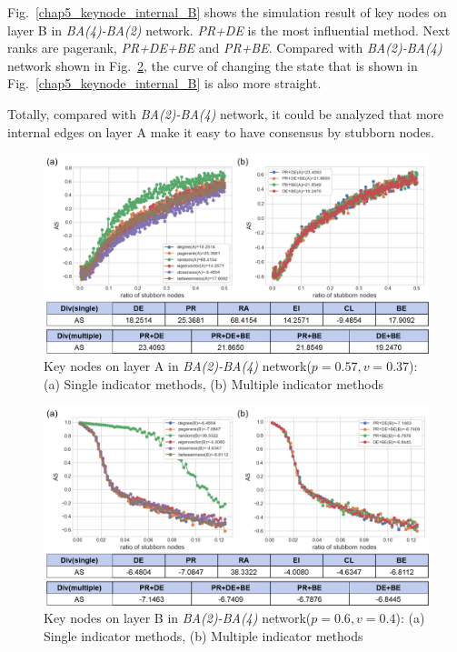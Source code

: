 Fig.~\ref{chap5_keynode_internal_B} shows the simulation result of key nodes on layer B in \textit{BA(4)-BA(2)} network. \textit{PR+DE} is the most influential method. Next ranks are pagerank, \textit{PR+DE+BE} and \textit{PR+BE}. Compared with \textit{BA(2)-BA(4)} network shown in Fig.~\ref{chap5_keynode_internal_B2}, the curve of changing the state that is shown in Fig.~\ref{chap5_keynode_internal_B} is also more straight. 

Totally, compared with \textit{BA(2)-BA(4)} network, it could be analyzed that more internal edges on layer A make it easy to have consensus by stubborn nodes. 

\begin{figure}[!htb]
	\centering
	\includegraphics[width=\hsize]{figure/chap5_keynode_internal_A2.png}
	\caption{Key nodes on layer A in \textit{BA(2)-BA(4)} network($p=0.57, v=0.37$):
		(a) Single indicator methods, (b) Multiple indicator methods}
	\label{chap5_keynode_internal_A2}
\end{figure}
\begin{figure}[!htb]
	\centering
	\includegraphics[width=\hsize]{figure/chap5_keynode_internal_B2.png}
	\caption{Key nodes on layer B in \textit{BA(2)-BA(4)} network($p=0.6, v=0.4$):
		(a) Single indicator methods, (b) Multiple indicator methods}
	\label{chap5_keynode_internal_B2}
\end{figure}

